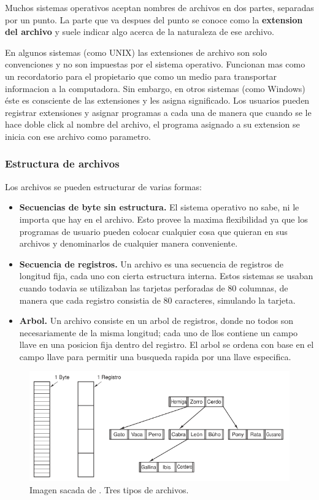 \documentclass[12pt]{article}
\begin{document}
  Muchos sistemas operativos aceptan nombres de archivos en dos partes, separadas por un punto. La parte que va despues del punto se conoce como la \textbf{extension del archivo} y suele indicar algo acerca de la naturaleza de ese archivo.
  
  En algunos sistemas (como UNIX) las extensiones de archivo son solo convenciones y no son impuestas por el sistema operativo. Funcionan mas como un recordatorio para el propietario que como un medio para transportar informacion a la computadora. Sin embargo, en otros sistemas (como Windows) éste es consciente de las extensiones y les asigna significado. Los usuarios pueden registrar extensiones y asignar programas a cada una de manera que cuando se le hace doble click al nombre del archivo, el programa asignado a su extension se inicia con ese archivo como parametro.

  \subsubsection{Estructura de archivos}
  Los archivos se pueden estructurar de varias formas:
  \begin{itemize}
    \item \textbf{Secuencias de byte sin estructura.} El sistema operativo no sabe, ni le importa que hay en el archivo. Esto provee la maxima flexibilidad ya que los programas de usuario pueden colocar cualquier cosa que quieran en sus archivos y denominarlos de cualquier manera conveniente.

    \item \textbf{Secuencia de registros.} Un archivo es una secuencia de registros de longitud fija, cada uno con cierta estructura interna. Estos sistemas se usaban cuando todavia se utilizaban las tarjetas perforadas de 80 columnas, de manera que cada registro consistia de 80 caracteres, simulando la tarjeta.

    \item \textbf{Arbol.} Un archivo consiste en un arbol de registros, donde no todos son necesariamente de la misma longitud; cada uno de llos contiene un campo llave en una posicion fija dentro del registro. El arbol se ordena con base en el campo llave para permitir una busqueda rapida por una llave especifica.
  \end{itemize} 

  \begin{figure}[H]
    \centering
    \includegraphics[width=\linewidth]{imagenes/tipos-de-archivos.png}
    \caption{Imagen sacada de \parencite{tanenbaum}. Tres tipos de archivos.}
    \label{fig:tipos-de-archivos}
  \end{figure}
\end{document}
